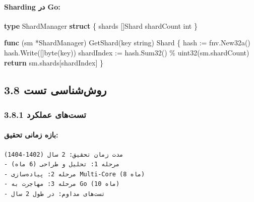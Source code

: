 \documentclass[
]{article}
\newenvironment{Shaded}{}{}
\newcommand{\ControlFlowTok}[1]{\textcolor[rgb]{0.00,0.44,0.13}{\textbf{#1}}}
\newcommand{\DataTypeTok}[1]{\textcolor[rgb]{0.56,0.13,0.00}{#1}}
\newcommand{\KeywordTok}[1]{\textcolor[rgb]{0.00,0.44,0.13}{\textbf{#1}}}
\newcommand{\NormalTok}[1]{#1}
\newcommand{\OperatorTok}[1]{\textcolor[rgb]{0.40,0.40,0.40}{#1}}
\begin{document}
\paragraph{Sharding در Go:}\label{sharding-ux62fux631-go}

\begin{Shaded}
\begin{Highlighting}[]
\KeywordTok{type}\NormalTok{ ShardManager }\KeywordTok{struct} \OperatorTok{\{}
\NormalTok{    shards }\OperatorTok{[]}\NormalTok{Shard}
\NormalTok{    shardCount }\DataTypeTok{int}
\OperatorTok{\}}

\KeywordTok{func} \OperatorTok{(}\NormalTok{sm }\OperatorTok{*}\NormalTok{ShardManager}\OperatorTok{)}\NormalTok{ GetShard}\OperatorTok{(}\NormalTok{key }\DataTypeTok{string}\OperatorTok{)}\NormalTok{ Shard }\OperatorTok{\{}
\NormalTok{    hash }\OperatorTok{:=}\NormalTok{ fnv}\OperatorTok{.}\NormalTok{New32a}\OperatorTok{()}
\NormalTok{    hash}\OperatorTok{.}\NormalTok{Write}\OperatorTok{([]}\DataTypeTok{byte}\OperatorTok{(}\NormalTok{key}\OperatorTok{))}
\NormalTok{    shardIndex }\OperatorTok{:=}\NormalTok{ hash}\OperatorTok{.}\NormalTok{Sum32}\OperatorTok{()} \OperatorTok{\%} \DataTypeTok{uint32}\OperatorTok{(}\NormalTok{sm}\OperatorTok{.}\NormalTok{shardCount}\OperatorTok{)}
    \ControlFlowTok{return}\NormalTok{ sm}\OperatorTok{.}\NormalTok{shards}\OperatorTok{[}\NormalTok{shardIndex}\OperatorTok{]}
\OperatorTok{\}}
\end{Highlighting}
\end{Shaded}

\subsection{3.8 روش‌شناسی
تست}\label{ux631ux648ux634ux634ux646ux627ux633ux6cc-ux62aux633ux62a}

\subsubsection{3.8.1 تست‌های
عملکرد}\label{ux62aux633ux62aux647ux627ux6cc-ux639ux645ux644ux6a9ux631ux62f}

\paragraph{بازه زمانی
تحقیق:}\label{ux628ux627ux632ux647-ux632ux645ux627ux646ux6cc-ux62aux62dux642ux6ccux642}

\begin{verbatim}
مدت زمان تحقیق: 2 سال (1402-1404)
- مرحله 1: تحلیل و طراحی (6 ماه)
- مرحله 2: پیاده‌سازی Multi-Core (8 ماه)
- مرحله 3: مهاجرت به Go (10 ماه)
- تست‌های مداوم: در طول 2 سال
\end{verbatim}
\end{document}
